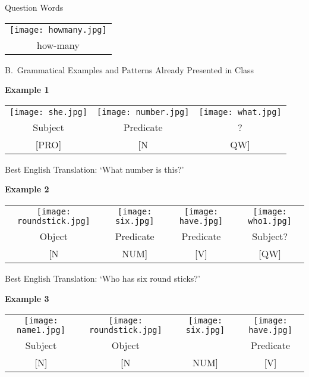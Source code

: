 \documentclass{tufte-book}
\begin{document}
\vspace{0.25cm}\noindent Question Words

\begin{table}[h!]
\begin{tabular}{c}
\texttt{[image: howmany.jpg]}\\
\footnotesize how-many\\
\end{tabular}
\end{table}

\vspace{0.25cm}\noindent B.~Grammatical Examples and Patterns Already Presented in Class

\vspace{0.25cm}\noindent \textbf{Example 1}
\begin{table*}[h!]
\begin{tabular}{c | c c}
\texttt{[image: she.jpg]}&\texttt{[image: number.jpg]}&\texttt{[image: what.jpg]}\\
\footnotesize Subject & \footnotesize Predicate & \footnotesize ?\\
\footnotesize [PRO] & \footnotesize [N & \footnotesize QW]\\
\end{tabular}
\end{table*}

Best English Translation: `What number is this?'
\newpage

\vspace{0.25cm}\noindent \textbf{Example 2}
\begin{table*}[h!]
\begin{tabular}{c c | c | c}
\texttt{[image: roundstick.jpg]}&\texttt{[image: six.jpg]}&\texttt{[image: have.jpg]} & \texttt{[image: who1.jpg]} \\
\footnotesize Object & \footnotesize Predicate & \footnotesize Predicate &  \footnotesize Subject?\\
\footnotesize [N & \footnotesize NUM] & \footnotesize [V] &  \footnotesize [QW]\\
\end{tabular}
\end{table*}

Best English Translation: `Who has six round sticks?'

\vspace{0.25cm}\noindent \textbf{Example 3}
\begin{table*}[h!]
\begin{tabular}{c | c c| c}
\texttt{[image: name1.jpg]}&\texttt{[image: roundstick.jpg]}&\texttt{[image: six.jpg]} & \texttt{[image: have.jpg]} \\
\footnotesize Subject & \footnotesize Object &  &  \footnotesize Predicate\\
\footnotesize [N] & \footnotesize [N & \footnotesize NUM] &  \footnotesize [V]\\
\end{tabular}
\end{table*}
\end{document}
